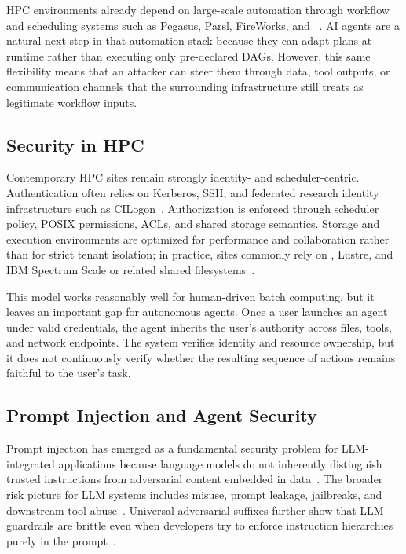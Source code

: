 HPC environments already depend on large-scale automation through workflow and scheduling systems such as Pegasus, Parsl, FireWorks, and \slurm{}~\cite{deelman2015pegasus,babuji2019parsl,jain2015fireworks,yoo2003slurm}. AI agents are a natural next step in that automation stack because they can adapt plans at runtime rather than executing only pre-declared DAGs. However, this same flexibility means that an attacker can steer them through data, tool outputs, or communication channels that the surrounding infrastructure still treats as legitimate workflow inputs.

\subsection{Security in HPC}

Contemporary HPC sites remain strongly identity- and scheduler-centric. Authentication often relies on Kerberos, SSH, and federated research identity infrastructure such as CILogon~\cite{neuman1994kerberos,basney2014cilogon}. Authorization is enforced through scheduler policy, POSIX permissions, ACLs, and shared storage semantics. Storage and execution environments are optimized for performance and collaboration rather than for strict tenant isolation; in practice, sites commonly rely on \slurm{}, Lustre, and IBM Spectrum Scale or related shared filesystems~\cite{yoo2003slurm,lustre2025intro,ibm2024spectrumscale}.

This model works reasonably well for human-driven batch computing, but it leaves an important gap for autonomous agents. Once a user launches an agent under valid credentials, the agent inherits the user's authority across files, tools, and network endpoints. The system verifies identity and resource ownership, but it does not continuously verify whether the resulting sequence of actions remains faithful to the user's task.

\subsection{Prompt Injection and Agent Security}

Prompt injection has emerged as a fundamental security problem for LLM-integrated applications because language models do not inherently distinguish trusted instructions from adversarial content embedded in data~\cite{greshake2023indirect,liu2023houyi,liu2024prompt}. The broader risk picture for LLM systems includes misuse, prompt leakage, jailbreaks, and downstream tool abuse~\cite{perez2022ignore,weidinger2022taxonomy,owasp2025llm}. Universal adversarial suffixes further show that LLM guardrails are brittle even when developers try to enforce instruction hierarchies purely in the prompt~\cite{zou2023universal}.

